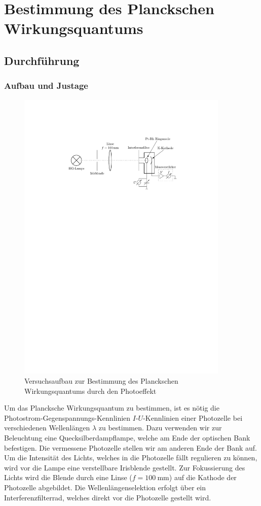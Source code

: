 \documentclass[11pt, a4paper]{article}
\numberwithin{equation}{section}
\begin{document}
\section{Bestimmung des Planckschen Wirkungsquantums}

\subsection{Durchführung}

\subsubsection{Aufbau und Justage}
\begin{figure}[h]
	\centering
	\includegraphics[width=0.9\textwidth]{./figures/versuchsaufbau_photoeffekt.pdf}
	\caption{Versuchsaufbau zur Bestimmung des Planckschen Wirkungsquantums durch den Photoeffekt}
	\label{fig:aufbau_photoeffekt}
\end{figure}
Um das Plancksche Wirkungsquantum zu bestimmen, ist es nötig die Photostrom-Gegenspannungs-Kennlinien $I$-$U$-Kennlinien einer Photozelle bei verschiedenen Wellenlängen $\lambda$ zu bestimmen.
Dazu verwenden wir zur Beleuchtung eine Quecksilberdampflampe, welche am Ende der optischen Bank befestigen.
Die vermessene Photozelle stellen wir am anderen Ende der Bank auf.
Um die Intensität des Lichts, welches in die Photozelle fällt regulieren zu können, wird vor die Lampe eine verstellbare Irisblende gestellt.
Zur Fokussierung des Lichts wird die Blende durch eine Linse ($f=\SI{100}{\milli\metre}$) auf die Kathode der Photozelle abgebildet.
Die Wellenlängenselektion erfolgt über ein Interferenzfilterrad, welches direkt vor die Photozelle gestellt wird.
\end{document}
